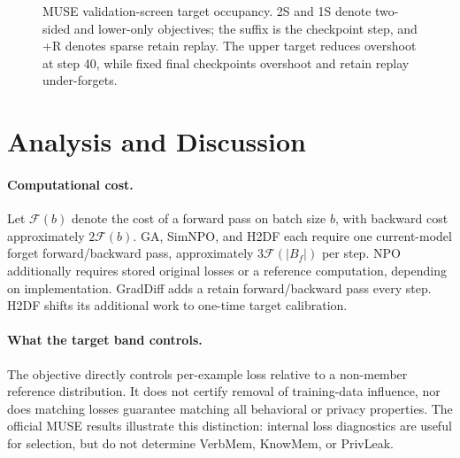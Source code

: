 \documentclass[10pt,twocolumn]{article}
\newcommand{\Fcal}{\mathcal{F}}
\newcommand{\method}{\textsc{H2DF}}
\begin{document}
\begin{figure}[t]
\centering
{}
\caption{MUSE validation-screen target occupancy. 2S and 1S denote two-sided
and lower-only objectives; the suffix is the checkpoint step, and +R denotes
sparse retain replay. The upper target reduces overshoot at step 40, while
fixed final checkpoints overshoot and retain replay under-forgets.}
\label{fig:occupancy}
\end{figure}
\section{Analysis and Discussion}

\paragraph{Computational cost.}
Let $\Fcal(b)$ denote the cost of a forward pass on batch size $b$, with backward
cost approximately $2\Fcal(b)$. GA, SimNPO, and \method{} each require one
current-model forget forward/backward pass, approximately $3\Fcal(|B_f|)$ per
step. NPO additionally requires stored original losses or a reference
computation, depending on implementation. GradDiff adds a retain forward/backward
pass every step. \method{} shifts its additional work to one-time target
calibration.

\paragraph{What the target band controls.}
The objective directly controls per-example loss relative to a non-member
reference distribution. It does not certify removal of training-data influence,
nor does matching losses guarantee matching all behavioral or privacy properties.
The official MUSE results illustrate this distinction: internal loss diagnostics
are useful for selection, but do not determine VerbMem, KnowMem, or PrivLeak.
\end{document}
